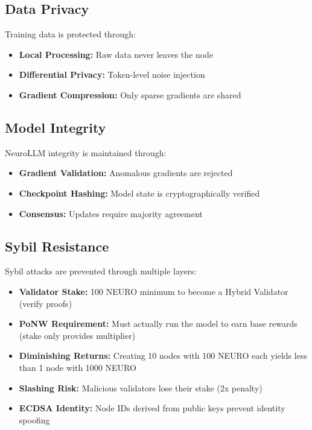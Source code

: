 \documentclass[11pt,a4paper]{article}
\begin{document}
\subsection{Data Privacy}

Training data is protected through:
\begin{itemize}
    \item \textbf{Local Processing:} Raw data never leaves the node
    \item \textbf{Differential Privacy:} Token-level noise injection
    \item \textbf{Gradient Compression:} Only sparse gradients are shared
\end{itemize}

\subsection{Model Integrity}

NeuroLLM integrity is maintained through:
\begin{itemize}
    \item \textbf{Gradient Validation:} Anomalous gradients are rejected
    \item \textbf{Checkpoint Hashing:} Model state is cryptographically verified
    \item \textbf{Consensus:} Updates require majority agreement
\end{itemize}

\subsection{Sybil Resistance}

Sybil attacks are prevented through multiple layers:
\begin{itemize}
    \item \textbf{Validator Stake:} 100 NEURO minimum to become a Hybrid Validator (verify proofs)
    \item \textbf{PoNW Requirement:} Must actually run the model to earn base rewards (stake only provides multiplier)
    \item \textbf{Diminishing Returns:} Creating 10 nodes with 100 NEURO each yields less than 1 node with 1000 NEURO
    \item \textbf{Slashing Risk:} Malicious validators lose their stake (2x penalty)
    \item \textbf{ECDSA Identity:} Node IDs derived from public keys prevent identity spoofing
\end{itemize}
\end{document}
